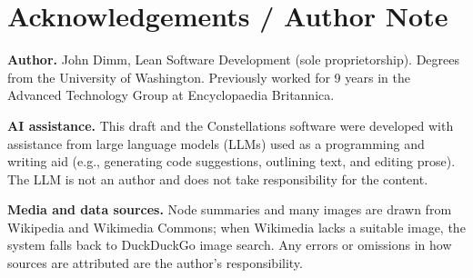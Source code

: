\section*{Acknowledgements / Author Note}

\textbf{Author.} John Dimm, Lean Software Development (sole proprietorship). Degrees from the University of Washington. Previously worked for 9 years in the Advanced Technology Group at Encyclopaedia Britannica.

\textbf{AI assistance.} This draft and the Constellations software were developed with assistance from large language models (LLMs) used as a programming and writing aid (e.g., generating code suggestions, outlining text, and editing prose). The LLM is not an author and does not take responsibility for the content.

\textbf{Media and data sources.} Node summaries and many images are drawn from Wikipedia and Wikimedia Commons; when Wikimedia lacks a suitable image, the system falls back to DuckDuckGo image search. Any errors or omissions in how sources are attributed are the author's responsibility.
